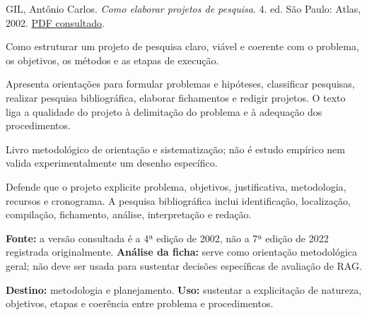 {\small GIL, Antônio Carlos. \textit{Como elaborar projetos de pesquisa}. 4. ed. São Paulo: Atlas, 2002. \href{https://files.cercomp.ufg.br/weby/up/150/o/Anexo_C1_como_elaborar_projeto_de_pesquisa_-_antonio_carlos_gil.pdf}{PDF consultado}.\par}

Como estruturar um projeto de pesquisa claro, viável e coerente com o problema, os objetivos, os métodos e as etapas de execução.

Apresenta orientações para formular problemas e hipóteses, classificar pesquisas, realizar pesquisa bibliográfica, elaborar fichamentos e redigir projetos. O texto liga a qualidade do projeto à delimitação do problema e à adequação dos procedimentos.

Livro metodológico de orientação e sistematização; não é estudo empírico nem valida experimentalmente um desenho específico.

Defende que o projeto explicite problema, objetivos, justificativa, metodologia, recursos e cronograma. A pesquisa bibliográfica inclui identificação, localização, compilação, fichamento, análise, interpretação e redação.

\begin{itemize}
\end{itemize}

\textbf{Fonte:} a versão consultada é a 4ª edição de 2002, não a 7ª edição de 2022 registrada originalmente. \textbf{Análise da ficha:} serve como orientação metodológica geral; não deve ser usada para sustentar decisões específicas de avaliação de RAG.

\textbf{Destino:} metodologia e planejamento. \textbf{Uso:} sustentar a explicitação de natureza, objetivos, etapas e coerência entre problema e procedimentos.

